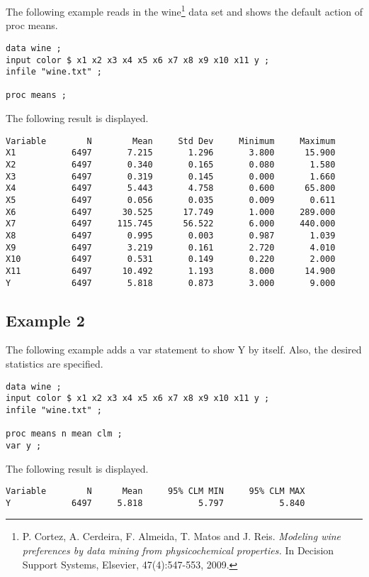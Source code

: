 \documentclass[12pt]{article}
\begin{document}
The following example reads in the wine\footnote{
P. Cortez, A. Cerdeira, F. Almeida, T. Matos and J. Reis.
{\it Modeling wine preferences by data mining from physicochemical properties.}
In Decision Support Systems, Elsevier, 47(4):547-553, 2009.}
data set and shows the default action of proc means.

{\scriptsize\begin{verbatim}
data wine ;
input color $ x1 x2 x3 x4 x5 x6 x7 x8 x9 x10 x11 y ;
infile "wine.txt" ;

proc means ;
\end{verbatim}}

The following result is displayed.

{\scriptsize\begin{verbatim}
Variable        N        Mean     Std Dev     Minimum     Maximum
X1           6497       7.215       1.296       3.800      15.900
X2           6497       0.340       0.165       0.080       1.580
X3           6497       0.319       0.145       0.000       1.660
X4           6497       5.443       4.758       0.600      65.800
X5           6497       0.056       0.035       0.009       0.611
X6           6497      30.525      17.749       1.000     289.000
X7           6497     115.745      56.522       6.000     440.000
X8           6497       0.995       0.003       0.987       1.039
X9           6497       3.219       0.161       2.720       4.010
X10          6497       0.531       0.149       0.220       2.000
X11          6497      10.492       1.193       8.000      14.900
Y            6497       5.818       0.873       3.000       9.000
\end{verbatim}}

\subsection*{Example 2}

The following example adds a var statement to show Y by itself.
Also, the desired statistics are specified.

{\scriptsize\begin{verbatim}
data wine ;
input color $ x1 x2 x3 x4 x5 x6 x7 x8 x9 x10 x11 y ;
infile "wine.txt" ;

proc means n mean clm ;
var y ;
\end{verbatim}}

The following result is displayed.

{\scriptsize\begin{verbatim}
Variable        N      Mean     95% CLM MIN     95% CLM MAX
Y            6497     5.818           5.797           5.840
\end{verbatim}}
\end{document}
